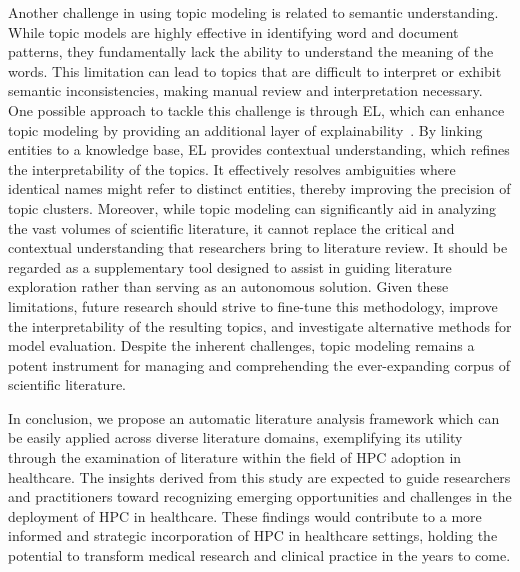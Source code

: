 Another challenge in using topic modeling is related to semantic understanding. While topic models are highly effective in identifying word and document patterns, they fundamentally lack the ability to understand the meaning of the words. This limitation can lead to topics that are difficult to interpret or exhibit semantic inconsistencies, making manual review and interpretation necessary. One possible approach to tackle this challenge is through EL, which can enhance topic modeling by providing an additional layer of explainability~\cite{dillan2023ldaviewer,10.1145/3126686.3126776}. By linking entities to a knowledge base, EL provides contextual understanding, which refines the interpretability of the topics. It effectively resolves ambiguities where identical names might refer to distinct entities, thereby improving the precision of topic clusters.  Moreover, while topic modeling can significantly aid in analyzing the vast volumes of scientific literature, it cannot replace the critical and contextual understanding that researchers bring to literature review. It should be regarded as a supplementary tool designed to assist in guiding literature exploration rather than serving as an autonomous solution. Given these limitations, future research should strive to fine-tune this methodology, improve the interpretability of the resulting topics, and investigate alternative methods for model evaluation. Despite the inherent challenges, topic modeling remains a potent instrument for managing and comprehending the ever-expanding corpus of scientific literature.

In conclusion, we propose an automatic literature analysis framework which can be easily applied across diverse literature domains, exemplifying its utility through the examination of literature within the field of HPC adoption in healthcare. The insights derived from this study are expected to guide researchers and practitioners toward recognizing emerging opportunities and challenges in the deployment of HPC in healthcare. These findings would contribute to a more informed and strategic incorporation of HPC in healthcare settings, holding the potential to transform medical research and clinical practice in the years to come.





















